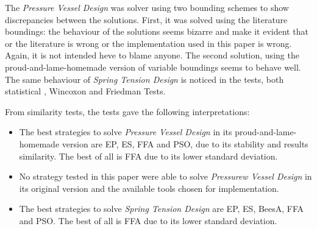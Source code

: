 The \textit{Pressure Vessel Design} was solver using two bounding schemes to show discrepancies
between the solutions.
First, it was solved using the literature boundings: the behaviour of the
solutions seems bizarre and make it evident that or the literature is wrong or the implementation
used in this paper is wrong.
Again, it is not intended heve to blame anyone.
The second solution, using the proud-and-lame-homemade
version of variable boundings seems to behave well.
The same behaviour of \textit{Spring Tension Design} is noticed in the tests, both statistical
, Wincoxon and Friedman Tests.

From similarity tests, the tests gave the following interpretations:

\begin{itemize}
    \item The best strategies to solve \textit{Pressure Vessel Design} in its proud-and-lame-homemade version
    are EP, ES, FFA and PSO, due to its stability and results similarity. The best of all is FFA due to its
    lower standard deviation.
    \item No strategy tested in this paper were able to solve \textit{Pressurew Vessel Design} in its original
    version and the available tools chosen for implementation.
    \item The best strategies to solve \textit{Spring Tension Design} are EP, ES, BeesA, FFA and PSO. The best of
    all is FFA due to its lower standard deviation.
\end{itemize}

